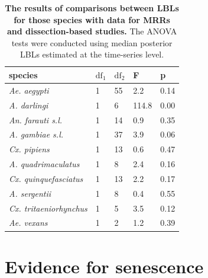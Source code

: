 \documentclass[12pt]{article}
\begin{document}
\begin{table}[htbp]
	\centering
	\begin{tabular}{l|l|l|l|l}
		species & \multicolumn{1}{l}{$\text{df}_1$} & \multicolumn{1}{l}{$\text{df}_2$} & \multicolumn{1}{l}{F} & \multicolumn{1}{l}{p} \\
		\midrule
		\textit{Ae. aegypti} & 1     & 55    & 2.2   & 0.14 \\
		\textit{A. darlingi} & 1     & 6     & 114.8   & 0.00 \\
		\textit{An. farauti s.l.} & 1     & 14    & 0.9  & 0.35 \\
		\textit{A. gambiae s.l.} & 1     & 37    & 3.9   & 0.06 \\
		\textit{Cx. pipiens} & 1     & 13    & 0.6   & 0.47 \\
		\textit{A. quadrimaculatus} & 1     & 8     & 2.4     & 0.16 \\
		\textit{Cx. quinquefasciatus} & 1     & 13    & 2.2    & 0.17 \\
		\textit{A. sergentii} & 1     & 8     & 0.4     & 0.55 \\
		\textit{Cx. tritaeniorhynchus} & 1     & 5     & 3.5   & 0.12 \\
		\textit{Ae. vexans} & 1     & 2     & 1.2   & 0.39 \\
	\end{tabular}%
	\caption{\textbf{The results of comparisons between LBLs for those species with data for MRRs and dissection-based studies.} The ANOVA tests were conducted using median posterior LBLs estimated at the time-series level.}
	\label{tab:comparison}%
\end{table}%

\section{Evidence for senescence}
\end{document}
